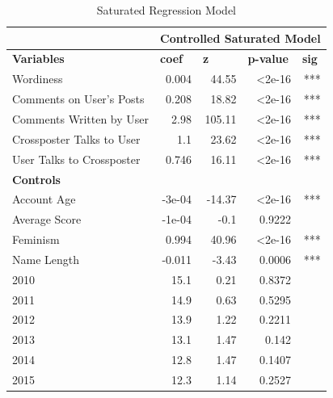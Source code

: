 \documentclass[letterpaper]{article}
\begin{document}
\begin{table}[htb]
\caption{Saturated Regression Model}
\centering
\begin{threeparttable}
 \begin{adjustbox}{max width=\columnwidth}
 \begin{tabular}{|p{4cm}|c|r|r|r|}
    \hline
          & \multicolumn{4}{c|}{\textbf{Controlled Saturated Model}} \\
    \hline
    \textbf{Variables} & \multicolumn{1}{l|}{\textbf{coef}} & \multicolumn{1}{l|}{\textbf{z}} & \multicolumn{1}{l|}{\textbf{p-value}} & \multicolumn{1}{l|}{\textbf{sig}} \\
    \hline
    Wordiness & \multicolumn{1}{r|}{0.004} & 44.55 & \textless2e-16 & *** \\
    Comments on User's Posts & \multicolumn{1}{r|}{0.208} & 18.82 & \textless2e-16 & *** \\
    Comments Written by User & \multicolumn{1}{r|}{2.98} & 105.11 & \textless2e-16 & *** \\
    Crossposter Talks to User & \multicolumn{1}{r|}{1.1} & 23.62 & \textless2e-16 & *** \\
    User Talks to Crossposter & \multicolumn{1}{r|}{0.746} & 16.11 & \textless2e-16 & *** \\\hline
    
    \textbf{Controls} &       &       &       &  \\\hline
    
    Account Age & \multicolumn{1}{r|}{-3e-04} & -14.37 & \textless2e-16 & *** \\
    Average Score & \multicolumn{1}{r|}{-1e-04} & -0.1  & 0.9222 &  \\
    Feminism & \multicolumn{1}{r|}{0.994} & 40.96 & \textless2e-16 & *** \\
    Name Length & \multicolumn{1}{r|}{-0.011} & -3.43 & 0.0006 & *** \\
    2010  & \multicolumn{1}{r|}{15.1} & 0.21  & 0.8372 &  \\
    2011  & \multicolumn{1}{r|}{14.9} & 0.63  & 0.5295 &  \\
    2012  & \multicolumn{1}{r|}{13.9} & 1.22  & 0.2211 &  \\
    2013  & \multicolumn{1}{r|}{13.1} & 1.47  & 0.142 &  \\
    2014  & \multicolumn{1}{r|}{12.8} & 1.47  & 0.1407 &  \\
    2015  & \multicolumn{1}{r|}{12.3} & 1.14  & 0.2527 &  \\\hline
    

\end{tabular}
\end{adjustbox}
\end{threeparttable}
\end{table}
\end{document}
